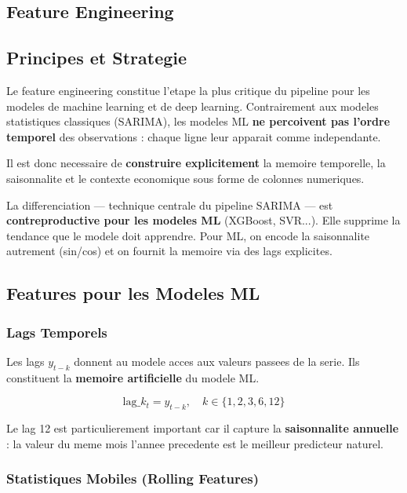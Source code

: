 \documentclass[12pt,a4paper]{report}
\begin{document}
\begin{itemize}[leftmargin=1.5em]
\chapter{Feature Engineering}

\section{Principes et Strategie}

Le feature engineering constitue l'etape la plus critique du pipeline
pour les modeles de machine learning et de deep learning. Contrairement
aux modeles statistiques classiques (SARIMA), les modeles ML
\textbf{ne percoivent pas l'ordre temporel} des observations :
chaque ligne leur apparait comme independante.

Il est donc necessaire de \textbf{construire explicitement} la memoire
temporelle, la saisonnalite et le contexte economique sous forme
de colonnes numeriques.

\begin{warn_box}[Differenciation et ML]
La differenciation --- technique centrale du pipeline SARIMA ---
est \textbf{contreproductive pour les modeles ML} (XGBoost, SVR...).
Elle supprime la tendance que le modele doit apprendre.
Pour ML, on encode la saisonnalite autrement (sin/cos) et on
fournit la memoire via des lags explicites.
\end{warn_box}

\section{Features pour les Modeles ML}

\subsection{Lags Temporels}

Les lags $y_{t-k}$ donnent au modele acces aux valeurs passees de la serie.
Ils constituent la \textbf{memoire artificielle} du modele ML.

\[
\text{lag}\_k_t = y_{t-k}, \quad k \in \{1, 2, 3, 6, 12\}
\]

Le lag 12 est particulierement important car il capture la
\textbf{saisonnalite annuelle} : la valeur du meme mois l'annee precedente
est le meilleur predicteur naturel.

\subsection{Statistiques Mobiles (Rolling Features)}


\end{itemize}
\end{document}
